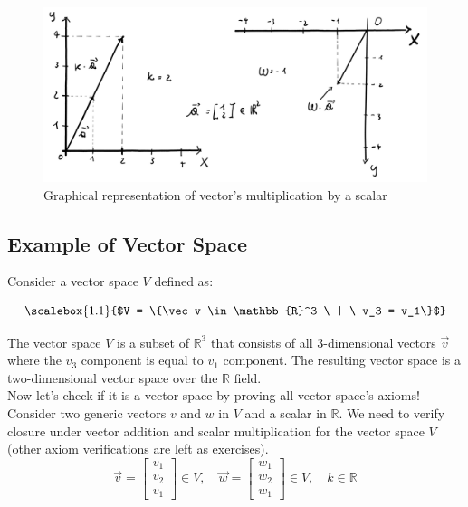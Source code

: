 \begin{figure}[h]
    \centering
    \includegraphics[scale=0.16]{Images/Linear_Algebra-scalar-mul.png}
    \caption{Graphical representation of vector's multiplication by a scalar}
    \label{fig:vector-mul}
\end{figure}

\subsection{Example of Vector Space}
Consider a vector space $V$ defined as:

$$
\scalebox{1.1}{$V = \{\vec v \in \mathbb{R}^3 \ | \ v_3 = v_1\}$}
$$

The vector space \(V\) is a subset of \(\mathbb{R}^3\) that consists of all 3-dimensional vectors \(\vec{v}\) where the $v_3$ component is equal to $v_1$ component. The resulting vector space is a two-dimensional vector space over the $\mathbb R$ field.
\\

Now let's check if it is a vector space by proving all vector space's axioms!
\\

Consider two generic vectors $v$ and $w$ in $V$ and a scalar in $\mathbb R$. We need to verify closure under vector addition and scalar multiplication for the vector space $V$ (other axiom verifications are left as exercises).
$$
\vec v = \begin{bmatrix}
    v_1 \\
    v_2 \\
    v_1
\end{bmatrix} \in V, \quad \vec w = \begin{bmatrix}
    w_1 \\
    w_2 \\
    w_1
\end{bmatrix} \in V, \quad k \in \mathbb{R}
$$

